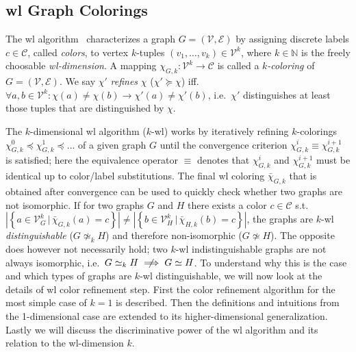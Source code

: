 \subsection{\acl{wl} Graph Colorings}%
\label{sec:related:character:wl}

The \acf{wl} algorithm~\cite{Weisfeiler1968} characterizes a graph $G = (\mathcal{V}, \mathcal{E})$ by assigning discrete labels $c \in \mathcal{C}$, called \textit{colors}, to vertex $k$-tuples $(v_1, \dots, v_k) \in \mathcal{V}^k$, where $k \in \mathbb{N}$ is the freely choosable \textit{\ac{wl}-dimension}.
A mapping $\chi_{G, k}: \mathcal{V}^k \to \mathcal{C}$ is called a \textit{$k$-coloring} of $G = (\mathcal{V}, \mathcal{E})$.
We say  $\chi'$ \textit{refines} $\chi$ ($\chi' \succeq \chi$) iff.\ $\forall a, b \in \mathcal{V}^k: \chi(a) \neq \chi(b) \rightarrow \chi'(a) \neq \chi'(b)$, i.e.\ $\chi'$ distinguishes at least those tuples that are distinguished by $\chi$.

The $k$-dimensional \ac{wl} algorithm ($k$-\acs{wl}) works by iteratively refining $k$-colorings $\chi_{G, k}^0 \preceq \chi_{G, k}^1 \preceq \dots$ of a given graph $G$ until the convergence criterion $\chi_{G, k}^i \equiv \chi_{G, k}^{i+1}$ is satisfied;
here the equivalence operator $\equiv$ denotes that $\chi_{G, k}^i$ and $\chi_{G, k}^{i+1}$ must be identical up to color/label substitutions.
The final \ac{wl} coloring $\bar{\chi}_{G, k}$ that is obtained after convergence can be used to quickly check whether two graphs are not isomorphic.
If for two graphs $G$ and $H$ there exists a color $c \in \mathcal{C}$ s.t.\ $\left|\left\{ a \in \mathcal{V}_G^k\, |\, \bar{\chi}_{G, k}(a) = c \right\}\right|\neq \left|\left\{ b \in \mathcal{V}_H^k\, |\, \bar{\chi}_{H, k}(b) = c \right\}\right|$, the graphs are $k$-\acs{wl} \textit{distinguishable} ($G \mathrel{{\not\simeq}_k} H$) and therefore non-isomorphic ($G \not\simeq H$). %
The opposite does however not necessarily hold;
two $k$-\acs{wl} indistinguishable graphs are not always isomorphic, i.e.\ $G \mathrel{{\simeq}_k} H \centernot\implies G \simeq H$.
To understand why this is the case and which types of graphs are $k$-\acs{wl} distinguishable, we will now look at the details of \ac{wl} color refinement step.
First the color refinement algorithm for the most simple case of $k = 1$ is described.
Then the definitions and intuitions from the 1-dimensional case are extended to its higher-dimensional generalization.
Lastly we will discuss the discriminative power of the \acs{wl} algorithm and its relation to the \acs{wl}-dimension $k$.

